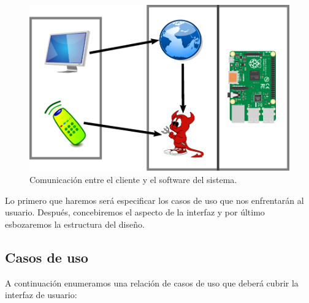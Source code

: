 \smallskip

\begin{figure}[H]
	\noindent \begin{centering}
		\includegraphics[width=\linewidth/2]{capitulo4/despliegue}
		\par\end{centering}
	\smallskip
	\caption[Comunicación entre el cliente y el software del sistema]{\label{fig:despliegue} Comunicación entre el cliente y el software del sistema. \cite{svg_raspberry}}
\end{figure} 

\smallskip

Lo primero que haremos será especificar los casos de uso que nos enfrentarán al usuario. Después, concebiremos el aspecto de la interfaz y por último esbozaremos la estructura del diseño.

\subsection{Casos de uso}

A continuación enumeramos una relación de casos de uso que deberá cubrir la interfaz de usuario:

